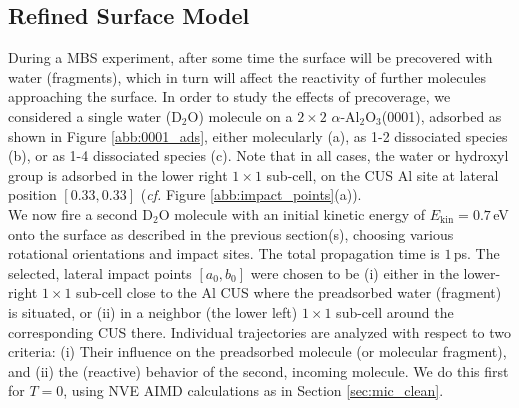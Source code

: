 \documentclass[11pt,DIV=13,BCOR=5mm,a4paper,headinclude]{scrbook}
\begin{document}
% 
% 
 
\subsection{Refined Surface Model}
During a MBS experiment, after some time the surface will be precovered with water (fragments), which in turn will affect the reactivity of further molecules approaching the surface.
In order to study the effects of precoverage, we considered a single water (D$_2$O) molecule on a $2\times 2$ $\alpha$-Al$_2$O$_3$(0001), adsorbed as shown in Figure \ref{abb:0001_ads}, either molecularly (a), as 1-2 dissociated species (b), or as 1-4 dissociated species (c).
Note that in all cases, the water or hydroxyl group is adsorbed in the lower right $1\times 1$ sub-cell, on the CUS Al site at lateral position $[0.33,0.33]$ (\textit{cf.} Figure \ref{abb:impact_points}(a)).
\\

We now fire a second D$_2$O molecule with an initial kinetic energy of $E_\textrm{kin}=0.7\,$eV onto the surface as described in the previous section(s), choosing various rotational orientations and impact sites.
The total propagation time is $1\,$ps.
The selected, lateral impact points $[a_0,b_0]$ were chosen to be  (i) either in the lower-right $1\times 1$ sub-cell close to the Al CUS where the preadsorbed water (fragment) is situated, or (ii) in a neighbor (the lower left) $1\times 1$ sub-cell around the corresponding CUS there.
Individual trajectories are analyzed with respect to two criteria: (i) Their influence on the preadsorbed molecule (or molecular fragment), and (ii) the (reactive) behavior of the second, incoming molecule.
We do this first for $T=0$, using NVE AIMD calculations as in Section \ref{sec:mic_clean}. 
\\
\end{document}
